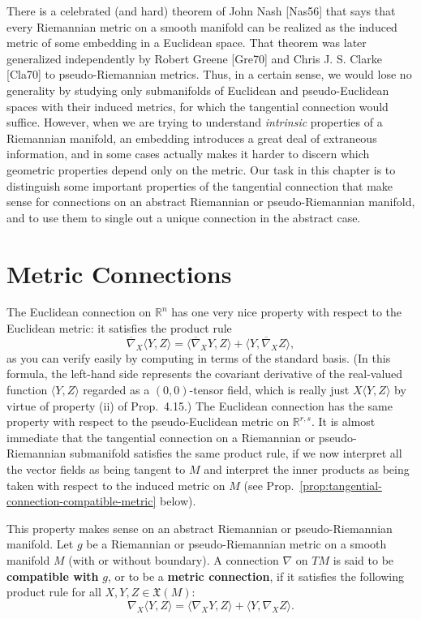 There is a celebrated (and hard) theorem of John Nash [Nas56] that says that every Riemannian metric on a smooth manifold can be realized as the induced metric of some embedding in a Euclidean space. That theorem was later generalized independently by Robert Greene [Gre70] and Chris J. S. Clarke [Cla70] to pseudo-Riemannian metrics. Thus, in a certain sense, we would lose no generality by studying only submanifolds of Euclidean and pseudo-Euclidean spaces with their induced metrics, for which the tangential connection would suffice. However, when we are trying to understand \emph{intrinsic} properties of a Riemannian manifold, an embedding introduces a great deal of extraneous information, and in some cases actually makes it harder to discern which geometric properties depend only on the metric. Our task in this chapter is to distinguish some important properties of the tangential connection that make sense for connections on an abstract Riemannian or pseudo-Riemannian manifold, and to use them to single out a unique connection in the abstract case.

\section{Metric Connections}

The Euclidean connection on $\mathbb{R}^n$ has one very nice property with respect to the Euclidean metric: it satisfies the product rule
\[
\overline{\nabla}_X\langle Y,Z \rangle = \langle \overline{\nabla}_X Y, Z \rangle + \langle Y, \overline{\nabla}_X Z \rangle,
\]
as you can verify easily by computing in terms of the standard basis. (In this formula, the left-hand side represents the covariant derivative of the real-valued function $\langle Y,Z\rangle$ regarded as a $(0,0)$-tensor field, which is really just $X\langle Y,Z\rangle$ by virtue of property (ii) of Prop.\ 4.15.) The Euclidean connection has the same property with respect to the pseudo-Euclidean metric on $\mathbb{R}^{r,s}$. It is almost immediate that the tangential connection on a Riemannian or pseudo-Riemannian submanifold satisfies the same product rule, if we now interpret all the vector fields as being tangent to $M$ and interpret the inner products as being taken with respect to the induced metric on $M$ (see Prop.~\ref{prop:tangential-connection-compatible-metric} below).

This property makes sense on an abstract Riemannian or pseudo-Riemannian manifold. Let $g$ be a Riemannian or pseudo-Riemannian metric on a smooth manifold $M$ (with or without boundary). A connection $\nabla$ on $TM$ is said to be \textbf{compatible with} $g$, or to be a \textbf{metric connection}, if it satisfies the following product rule for all $X,Y,Z \in \mathfrak{X}(M)$:
\begin{equation}
\nabla_X\langle Y,Z \rangle = \langle \nabla_X Y, Z \rangle + \langle Y, \nabla_X Z \rangle. \tag{5.1}
\end{equation}

